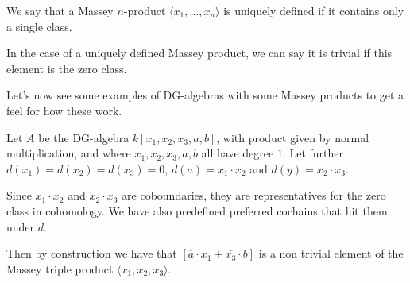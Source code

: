 \begin{definition}
We say that a Massey $n$-product $\langle x_1, \ldots, x_n\rangle$ is uniquely defined if it contains only a single class. 
\end{definition}

In the case of a uniquely defined Massey product, we can say it is trivial if this element is the zero class.  

Let's now see some examples of DG-algebras with some Massey products to get a feel for how these work. 

\begin{example}
Let $A$ be the DG-algebra $k[x_1,x_2,x_3,a,b]$, with product given by normal multiplication, and where $x_1, x_2, x_3, a, b$ all have degree $1$. Let further $d(x_1)=d(x_2)=d(x_3)=0$, $d(a)=x_1\cdot x_2$ and $d(y)=x_2\cdot x_3$. 

Since $x_1\cdot x_2$ and $x_2\cdot x_3$ are coboundaries, they are representatives for the zero class in cohomology. We have also predefined preferred cochains that hit them under $d$. 

Then by construction we have that $[\overline{a}\cdot x_1 + \overline{x_3}\cdot b]$ is a non trivial element of the Massey triple product $\langle x_1, x_2, x_3\rangle$. 
\end{example}

